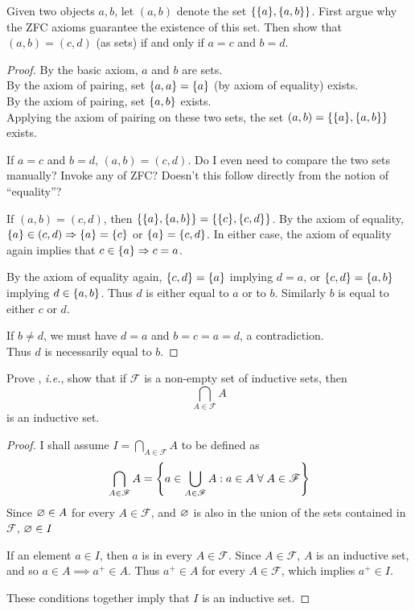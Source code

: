 \documentclass[12pt]{article}
\begin{document}
\begin{problem}
    Given two objects $a, b$, let $(a, b)$ denote the set $\set{\set{a}, \set{a, b}}$.
    First argue why the ZFC axioms guarantee the existence of this set.
    Then show that $(a, b) = (c, d)$ (as sets) if and only if $a = c$ and $b = d$.
\end{problem}

\begin{proof}
    By the basic axiom, $a$ and $b$ are sets. \\
    By the axiom of pairing, set $\set{a, a} = \set{a}$ (by axiom of equality) exists. \\
    By the axiom of pairing, set $\set{a, b}$ exists. \\
    Applying the axiom of pairing on these two sets, the set $(a, b) = \set{\{a}, \set{a, b}\}$ exists.

    If $a = c$ and $b = d$, $(a, b) = (c, d)$. \textcolor{exercise}{Do I even need to compare the two sets manually? Invoke any of ZFC? Doesn't this follow directly from the notion of ``equality''?}
    
    If $(a, b) = (c, d)$, then $\set{\{a}, \set{a, b}\} = \set{\{c}, \set{c, d}\}$. By the axiom of equality, $\set{a} \in (c, d) \implies \set{a} = \set{c}$ or $\set{a} = \set{c, d}$. In either case, the axiom of equality again implies that $c \in \set{a} \implies c = a$.

    By the axiom of equality again, $\set{c, d} = \set{a}$ implying $d = a$, or $\set{c, d} = \set{a, b}$ implying $d \in \set{a, b}$. Thus $d$ is either equal to $a$ or to $b$. Similarly $b$ is equal to either $c$ or $d$.

    If $b \neq d$, we must have $d = a$ and $b = c = a = d$, a contradiction. \\
    Thus $d$ is necessarily equal to $b$.
\end{proof}

\begin{problem}
    Prove , \textit{i.e.}, show that if $\mathscr{F}$ is a non-empty set of inductive sets, then \[
        \bigcap_{A \in \mathscr{F}} A
    \]
    is an inductive set.
\end{problem}

\begin{proof}
    I shall assume $I = \bigcap_{A \in \mathscr{F}}A$ to be defined as
    \[
        \bigcap_{A \in \mathscr{F}}A  = \set{a \in \bigcup_{A \in \mathscr{F}}A : a \in A \;\forall\; A \in \mathscr{F}}
    \]
    Since $\varnothing \in A$ for every $A \in \mathscr{F}$, and $\varnothing$ is also in the union of the sets contained in $\mathscr{F}$, $\varnothing \in I$

    If an element $a \in I$, then $a$ is in every $A \in \mathscr{F}$. Since $A \in \mathscr{F}$, $A$ is an inductive set, and so $a \in A \implies a^{+} \in A$. Thus $a^{+} \in A$ for every $A \in \mathscr{F}$, which implies $a^{+} \in I$.

    These conditions together imply that $I$ is an inductive set.
\end{proof}
\end{document}
